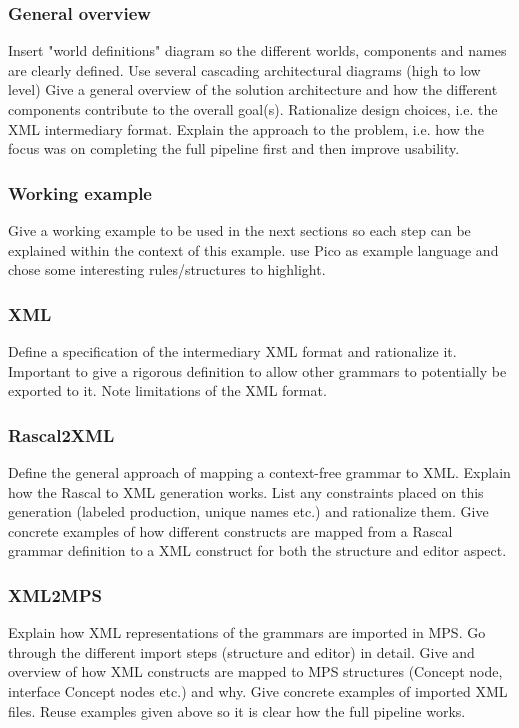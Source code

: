 \documentclass[a4paper, 11pt]{article}
\begin{document}
		\subsubsection*{General overview}
		Insert "world definitions" diagram so the different worlds, components and names are clearly defined. Use several cascading architectural diagrams (high to low level)
		Give a general overview of the solution architecture and how the different components contribute to the overall goal(s). Rationalize design choices, i.e. the XML intermediary format. Explain the approach to the problem, i.e. how the focus was on completing the full pipeline first and then improve usability.
		\subsubsection*{Working example}
		Give a working example to be used in the next sections so each step can be explained within the context of this example. use Pico as example language and chose some interesting rules/structures to highlight.
		\subsubsection*{XML}
		Define a specification of the intermediary XML format and rationalize it. Important to give a rigorous definition to allow other grammars to potentially be exported to it. Note limitations of the XML format.  
		\subsubsection*{Rascal2XML}
		Define the general approach of mapping a context-free grammar to XML.
		Explain how the Rascal to XML generation works. List any constraints placed on this generation (labeled production, unique names etc.) and rationalize them. Give concrete examples of how different constructs are mapped from a Rascal grammar definition to a XML construct for both the structure and editor aspect.
		\subsubsection*{XML2MPS}
		Explain how XML representations of the grammars are imported in MPS. Go through the different import steps (structure and editor) in detail. Give and overview of how XML constructs are mapped to MPS structures (Concept node, interface Concept nodes etc.) and why. Give concrete examples of imported XML files. Reuse examples given above so it is clear how the full pipeline works. 
\end{document}
